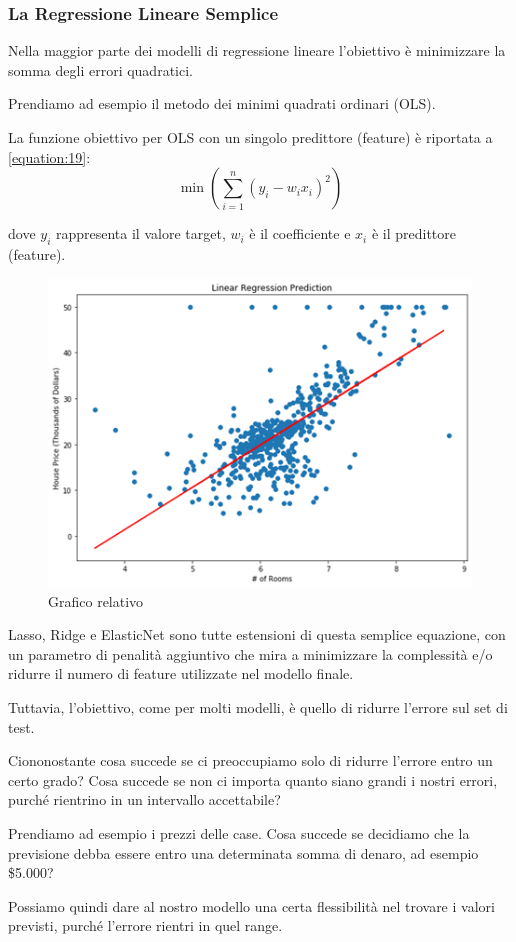 \subsubsection{La Regressione Lineare Semplice}
Nella maggior parte dei modelli di regressione lineare l'obiettivo è minimizzare la somma degli errori quadratici.

Prendiamo ad esempio il metodo dei minimi quadrati ordinari (OLS).

La funzione obiettivo per OLS con un singolo predittore (feature) è riportata a \ref{equation:19}:
\begin{equation}
        \min \left( \sum_{i=1}^{n} (y_i - w_i x_i)^2 \right)
        \label{equation:19}
    \end{equation}

dove $y_i$ rappresenta il valore target, $w_i$ è il coefficiente e $x_i$ è il predittore (feature).
\begin{figure}
    \centering
    \includegraphics[width=0.5\linewidth]{images/img101.png}
    \caption{Grafico relativo}
\end{figure}

Lasso, Ridge e ElasticNet sono tutte estensioni di questa semplice equazione, con un parametro di penalità aggiuntivo che mira a minimizzare la complessità e/o ridurre il numero di feature utilizzate nel modello finale. 

Tuttavia, l'obiettivo, come per molti modelli, è quello di ridurre l'errore sul set di test.

Ciononostante cosa succede se ci preoccupiamo solo di ridurre l'errore entro un certo grado? Cosa succede se non ci importa quanto siano grandi i nostri errori, purché rientrino in un intervallo accettabile?

Prendiamo ad esempio i prezzi delle case. Cosa succede se decidiamo che la previsione debba essere entro una determinata somma di denaro, ad esempio \$5.000? 

Possiamo quindi dare al nostro modello una certa flessibilità nel trovare i valori previsti, purché l'errore rientri in quel range.

